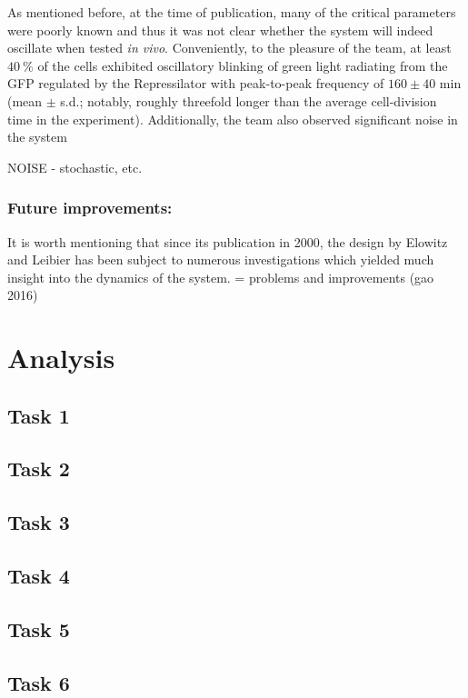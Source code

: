 \documentclass[runningheads,a4paper]{llncs}
\begin{document}
As mentioned before, at the time of publication, many of the critical parameters were poorly known and thus it was not clear whether the system will indeed oscillate when tested \textit{in vivo}. Conveniently, to the pleasure of the team, at least $40\ \%$ of the cells exhibited oscillatory blinking of green light radiating from the GFP regulated by the Repressilator with peak-to-peak frequency of $160 \pm 40$ min (mean $\pm$ s.d.; notably, roughly threefold longer than the average cell-division time in the experiment)\cite{Elowitz2000d}. Additionally, the team also observed significant noise in the system 

NOISE - stochastic, etc.

\subsubsection*{Future improvements:}
It is worth mentioning that since its publication in 2000, the design by Elowitz and Leibier has been subject to numerous investigations which yielded much insight into the dynamics of the system. = problems and improvements (gao 2016)






\section*{Analysis}

\subsection*{Task 1}
\subsection*{Task 2}
\subsection*{Task 3}
\subsection*{Task 4}
\subsection*{Task 5}
\subsection*{Task 6}
\end{document}
